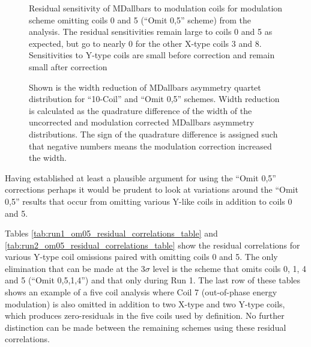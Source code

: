 \begin{landscape}
\begin{figure}[ht]
\caption{Residual sensitivity of MDallbars to modulation coils for modulation scheme omitting coils 0 and 5 (``Omit 0,5'' scheme) from the analysis. The residual sensitivities remain large to  coils 0 and 5 as expected, but go to nearly 0 for the other X-type coils 3 and 8. Sensitivities to Y-type coils are small before correction and remain small after correction}
\label{fig:md_omit05_residuals}
\end{figure}
\end{landscape}

\begin{figure}[ht]

\centering
{}
\caption{Shown is the width reduction of MDallbars asymmetry quartet distribution for ``10-Coil'' and ``Omit 0,5'' schemes. Width reduction is calculated as the quadrature difference of the width of the uncorrected and modulation corrected MDallbars asymmetry distributions. The sign of the quadrature difference is assigned such that negative numbers means the modulation correction increased the width.}
\label{fig:md_width_compared}
\end{figure}

Having established at least a plausible argument for using the ``Omit 0,5'' corrections perhaps it would be prudent to look at variations around the ``Omit 0,5'' results that occur from omitting various Y-like coils in addition to coils 0 and 5. 

Tables \ref{tab:run1_om05_residual_correlations_table} and \ref{tab:run2_om05_residual_correlations_table} show the residual correlations for various Y-type coil omissions paired with omitting coils 0 and 5. The only elimination that can be made at the $3\sigma$ level is the scheme that omits coils 0, 1, 4 and 5 (``Omit 0,5,1,4'') and that only during Run 1. The last row of these tables shows an example of a five coil analysis where Coil 7 (out-of-phase energy modulation) is also omitted in addition to two X-type and two Y-type coils, which produces zero-residuals in the five coils used by definition. No further distinction can be made between the remaining schemes using these residual correlations. 


